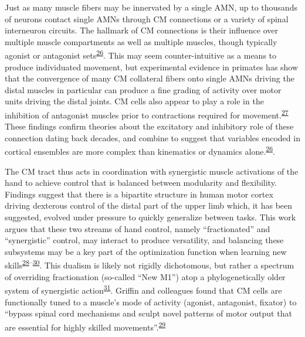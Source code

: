 \documentclass[
  a4paper,
]{article}
\begin{document}
Just as many muscle fibers may be innervated by a single AMN, up to
thousands of neurons contact single AMNs through CM connections or a
variety of spinal interneuron circuits. The hallmark of CM connections
is their influence over multiple muscle compartments as well as multiple
muscles, though typically agonist or antagonist
sets\textsuperscript{\protect\hyperlink{ref-cheneyFunctionalClassesPrimate1980}{26}}.
This may seem counter-intuitive as a means to produce individuated
movement, but experimental evidence in primates has show that the
convergence of many CM collateral fibers onto single AMNs driving the
distal muscles in particular can produce a fine grading of activity over
motor units driving the distal joints. CM cells also appear to play a
role in the inhibition of antagonist muscles prior to contractions
required for
movement.\textsuperscript{\protect\hyperlink{ref-griffinMotorCortexUses2020}{27}}
These findings confirm theories about the excitatory and inhibitory role
of these connection dating back decades, and combine to suggest that
variables encoded in cortical ensembles are more complex than kinematics
or dynamics
alone.\textsuperscript{\protect\hyperlink{ref-cheneyFunctionalClassesPrimate1980}{26}}.

The CM tract thus acts in coordination with synergistic muscle
activations of the hand to achieve control that is balanced between
modularity and flexibility. Findings suggest that there is a bipartite
structure in human motor cortex driving dexterous control of the distal
part of the upper limb which, it has been suggested, evolved under
pressure to quickly generalize between tasks. This work argues that
these two streams of hand control, namely ``fractionated'' and
``synergistic'' control, may interact to produce versatility, and
balancing these subsystems may be a key part of the optimization
function when learning new
skills\textsuperscript{\protect\hyperlink{ref-Rathelot2009}{28}--\protect\hyperlink{ref-Takei2017}{30}}.
This dualism is likely not rigidly dichotomous, but rather a spectrum of
overriding fractionation (so-called ``New M1'') atop a phylogenetically
older system of synergistic
action\textsuperscript{\protect\hyperlink{ref-dumCorticospinalSystemStructural2011}{31}}.
Griffin and colleagues found that CM cells are functionally tuned to a
muscle's mode of activity (agonist, antagonist, fixator) to ``bypass
spinal cord mechanisms and sculpt novel patterns of motor output that
are essential for highly skilled
movements''.\textsuperscript{\protect\hyperlink{ref-griffinCorticomotoneuronalCellsAre2015}{29}}
\end{document}

